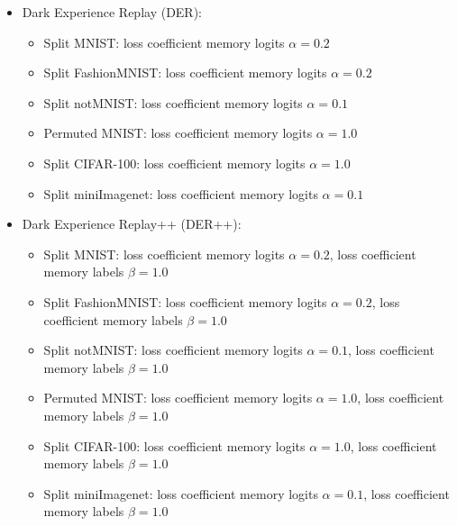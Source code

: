 \begin{itemize}
\begin{itemize}
    \end{itemize}
    \item Dark Experience Replay (DER):
    \begin{itemize}
        \item Split MNIST: loss coefficient memory logits $\alpha=0.2$
        \item Split FashionMNIST: loss coefficient memory logits $\alpha=0.2$
        \item Split notMNIST: loss coefficient memory logits $\alpha=0.1$
        \item Permuted MNIST: loss coefficient memory logits $\alpha=1.0$
        \item Split CIFAR-100: loss coefficient memory logits $\alpha=1.0$
        \item Split miniImagenet: loss coefficient memory logits $\alpha=0.1$
    \end{itemize}
    \item Dark Experience Replay++ (DER++):
    \begin{itemize}
        \item Split MNIST: loss coefficient memory logits $\alpha=0.2$, loss coefficient memory labels $\beta=1.0$
        \item Split FashionMNIST: loss coefficient memory logits $\alpha=0.2$, loss coefficient memory labels $\beta=1.0$
        \item Split notMNIST: loss coefficient memory logits $\alpha=0.1$, loss coefficient memory labels $\beta=1.0$
        \item Permuted MNIST: loss coefficient memory logits $\alpha=1.0$, loss coefficient memory labels $\beta=1.0$
        \item Split CIFAR-100: loss coefficient memory logits $\alpha=1.0$, loss coefficient memory labels $\beta=1.0$
        \item Split miniImagenet: loss coefficient memory logits $\alpha=0.1$, loss coefficient memory labels $\beta=1.0$
    \end{itemize}
\end{itemize}









